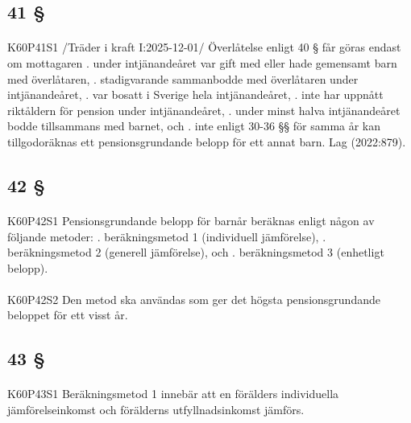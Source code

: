 \documentclass[a4paper,notitlepage,openany,10pt]{book}
\begin{document}
\subsection*{41 §}
\paragraph*{}
{\tiny K60P41S1}
/Träder i kraft I:2025-12-01/
Överlåtelse enligt 40 § får göras endast om mottagaren
. under intjänandeåret var gift med eller hade gemensamt barn med överlåtaren,
. stadigvarande sammanbodde med överlåtaren under intjänandeåret,
. var bosatt i Sverige hela intjänandeåret,
. inte har uppnått riktåldern för pension under intjänandeåret,
. under minst halva intjänandeåret bodde tillsammans med barnet, och
. inte enligt 30-36 §§ för samma år kan tillgodoräknas ett pensionsgrundande belopp för ett annat barn.
Lag (2022:879).
\subsection*{42 §}
\paragraph*{}
{\tiny K60P42S1}
Pensionsgrundande belopp för barnår beräknas enligt någon av följande metoder:
. beräkningsmetod 1 (individuell jämförelse),
. beräkningsmetod 2 (generell jämförelse), och
. beräkningsmetod 3 (enhetligt belopp).
\paragraph*{}
{\tiny K60P42S2}
Den metod ska användas som ger det högsta pensionsgrundande beloppet för ett visst år.
\subsection*{43 §}
\paragraph*{}
{\tiny K60P43S1}
Beräkningsmetod 1 innebär att en förälders individuella jämförelseinkomst och förälderns utfyllnadsinkomst jämförs.
\end{document}
